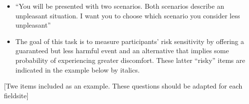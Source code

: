 \documentclass[idxtotoc,hyperref,openany]{labbook} %
\begin{document}


\begin{itemize}
\item ``You will be presented with two scenarios.  Both scenarios describe an unpleasant situation.  I want you to choose which scenario you consider less unpleasant''

\item The goal of this task is to measure participants' risk sensitivity by offering a guaranteed but less harmful event and an alternative that implies some probability of experiencing greater discomfort.  These latter ``risky'' items are indicated in the example below by italics.

\end{itemize}

[Twe items included as an example. These questions should be adapted for each fieldsite]
\end{document}
